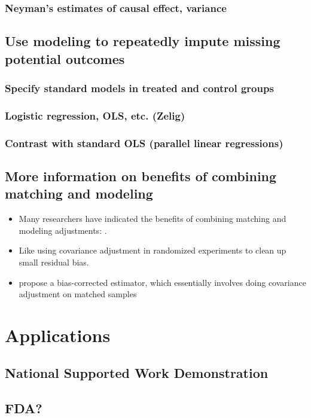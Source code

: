 \documentclass[11pt,titlepage]{article}
\begin{document}
\subsubsection{Neyman's estimates of causal effect, variance}
\subsection{Use modeling to repeatedly impute missing potential outcomes}
\subsubsection{Specify standard models in treated and control groups}
\subsubsection{Logistic regression, OLS, etc. (Zelig)}
\subsubsection{Contrast with standard OLS (parallel linear regressions)}
\subsection{More information on benefits of combining matching and modeling}
\begin{itemize}
\item Many researchers have indicated the benefits of combining matching and modeling adjustments: \cite{Rubin73b, RobRot95, HecHidTod97, AbaImb04}.                          
\item Like using covariance adjustment in randomized experiments to clean up small residual bias.
\item \cite{AbaImb04} propose a bias-corrected estimator, which essentially involves doing covariance adjustment on matched samples
\end{itemize} 

                                                                                                                          
\section{Applications}
\subsection{National Supported Work Demonstration}
\subsection{FDA?}
\end{document}
